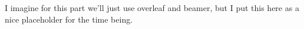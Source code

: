 I imagine for this part we'll just use overleaf and beamer, but I put this here as a nice
placeholder for the time being. 